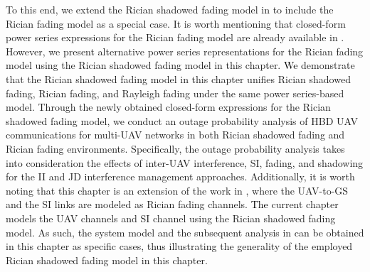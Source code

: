 To this end, we extend the Rician shadowed fading model in \cite{tan2018ricianShad} to include the Rician fading model as a special case. It is worth mentioning that closed-form power series expressions for the Rician fading model are already available in \cite[Table I and Table II]{rached2017unified}. However, we present alternative power series representations for the Rician fading model using the Rician shadowed fading model in this chapter. \textcolor{black}{We} demonstrate that the Rician shadowed fading model in this chapter unifies Rician shadowed fading, Rician fading, and Rayleigh fading under the same power series-based model. Through the newly obtained closed-form expressions for the Rician shadowed fading model, we conduct an outage probability analysis of HBD UAV communications for multi-UAV networks in both Rician shadowed fading and Rician fading environments. Specifically, the outage probability analysis takes into consideration the effects of inter-UAV interference, SI, fading, and shadowing for the II and JD interference management approaches. Additionally, it is worth noting that this chapter is an extension of the work in \cite{tan2018ricianShad}, where the UAV-to-GS and the SI links are modeled as Rician fading channels. \textcolor{black}{The} current chapter models the UAV channels and SI channel using the Rician shadowed fading model. As such, the system model and the subsequent analysis in \cite{tan2018ricianShad} can be obtained in this chapter as specific cases, thus illustrating the generality of the employed Rician shadowed fading model in this chapter. 

